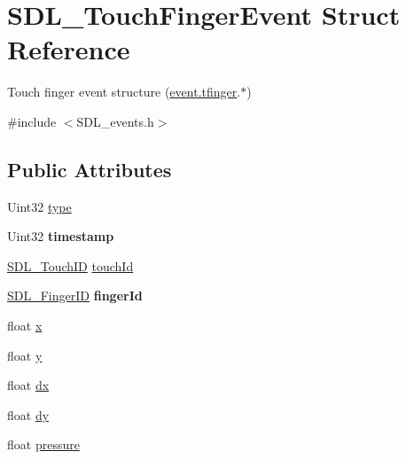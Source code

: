 \hypertarget{structSDL__TouchFingerEvent}{\section{S\+D\+L\+\_\+\+Touch\+Finger\+Event Struct Reference}
\label{structSDL__TouchFingerEvent}
}


Touch finger event structure (\hyperlink{unionSDL__Event_ab18d7d60794cb056948ffa58541bc3c5}{event.\+tfinger}.$\ast$)  




{\ttfamily \#include $<$S\+D\+L\+\_\+events.\+h$>$}

\subsection*{Public Attributes}
\begin{DoxyCompactItemize}
\item 
Uint32 \hyperlink{structSDL__TouchFingerEvent_a3883218fa3426065ca66086c100edbfa}{type}
\item 
\hypertarget{structSDL__TouchFingerEvent_abde2ab5cb013bbd21e37a65e2f8fa666}{Uint32 {\bfseries timestamp}}\label{structSDL__TouchFingerEvent_abde2ab5cb013bbd21e37a65e2f8fa666}

\item 
\hyperlink{structUint64}{S\+D\+L\+\_\+\+Touch\+I\+D} \hyperlink{structSDL__TouchFingerEvent_ad7a6f39ec9af1bf47b160d18314edd70}{touch\+Id}
\item 
\hypertarget{structSDL__TouchFingerEvent_a8616d46ed19906e3ee90a4d481d3a284}{\hyperlink{structUint64}{S\+D\+L\+\_\+\+Finger\+I\+D} {\bfseries finger\+Id}}\label{structSDL__TouchFingerEvent_a8616d46ed19906e3ee90a4d481d3a284}

\item 
float \hyperlink{structSDL__TouchFingerEvent_a0ce44b1342220fa17e9b9b4a77c2c906}{x}
\item 
float \hyperlink{structSDL__TouchFingerEvent_ac2bb8af638d2927a8e13f6ffe8f9384e}{y}
\item 
float \hyperlink{structSDL__TouchFingerEvent_ac6acac209d6e2bd659fdb6760081393d}{dx}
\item 
float \hyperlink{structSDL__TouchFingerEvent_a9c0320c5f18a6b9d10da657e166608c9}{dy}
\item 
float \hyperlink{structSDL__TouchFingerEvent_ab4fca822d0807b5748dbae8d3cc56524}{pressure}
\end{DoxyCompactItemize}


